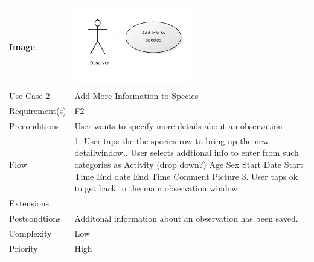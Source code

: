 \begin{tabular}[t]{|l|p{}|}\hline
	Image&\includegraphics[width=0.5\textwidth]{reqspec/uc/addinfo.png} \\\hline
	Use Case 2&Add More Information to Species\\\hline
	Requirement(s)&F2\\\hline
	Preconditions&User wants to specify more details about an observation\\\hline
	Flow& 1. User taps the the species row to bring up the new detailwindow.\newline
	2. User selects addtional info to enter from such categories as \newline
	Activity (drop down?) \newline
	Age\newline
	Sex\newline
	Start Date\newline
	Start Time\newline
	End date \newline
	End Time \newline
	Comment \newline
	Picture \newline
	3. User taps ok to get back to the main observation window.\\\hline
	Extensions& \\\hline
	Postcondtions&Additonal information about an observation has been saved.\\\hline
	Complexity&Low\\\hline
	Priority&High\\\hline
\end{tabular}

